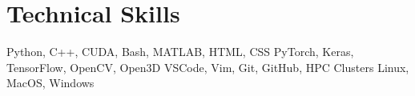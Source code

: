 \section{Technical Skills}

\setlength{\multicolsep}{-4pt}
\begin{multicols}{2}
    \raggedcolumns

    \resumeSubHeadingListStart
    {Python, C++, CUDA, Bash, MATLAB, HTML, CSS}
    {PyTorch, Keras, TensorFlow, OpenCV, Open3D}
    {VSCode, Vim, Git, GitHub, HPC Clusters}
    {Linux, MacOS, Windows}
    \resumeSubHeadingListEnd

\end{multicols}

